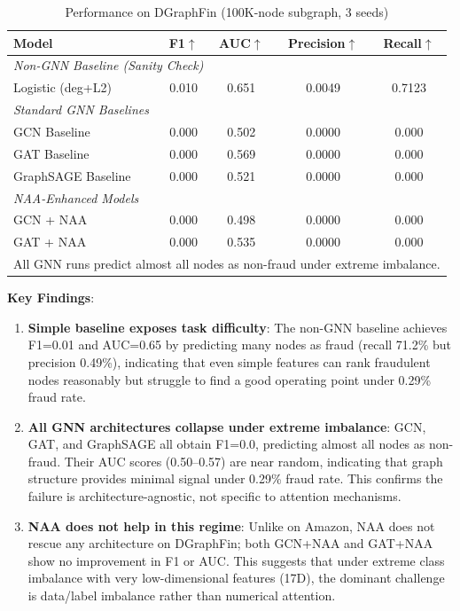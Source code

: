 \begin{table}[t]
\centering
\caption{Performance on DGraphFin (100K-node subgraph, 3 seeds)}
\label{tab:dgraphfin_main}
\small
\begin{tabular}{lcccc}
\toprule
\textbf{Model} & \textbf{F1}$\uparrow$ & \textbf{AUC}$\uparrow$ & \textbf{Precision}$\uparrow$ & \textbf{Recall}$\uparrow$ \\
\midrule
\multicolumn{5}{l}{\textit{Non-GNN Baseline (Sanity Check)}} \\
Logistic (deg+L2) & 0.010 & 0.651 & 0.0049 & 0.7123 \\
\midrule
\multicolumn{5}{l}{\textit{Standard GNN Baselines}} \\
GCN Baseline & 0.000 & 0.502 & 0.0000 & 0.000 \\
GAT Baseline & 0.000 & 0.569 & 0.0000 & 0.000 \\
GraphSAGE Baseline & 0.000 & 0.521 & 0.0000 & 0.000 \\
\midrule
\multicolumn{5}{l}{\textit{NAA-Enhanced Models}} \\
GCN + NAA & 0.000 & 0.498 & 0.0000 & 0.000 \\
GAT + NAA & 0.000 & 0.535 & 0.0000 & 0.000 \\
\bottomrule
\multicolumn{5}{l}{\footnotesize All GNN runs predict almost all nodes as non-fraud under extreme imbalance.} \\
\end{tabular}
\end{table}

\textbf{Key Findings}:

\begin{enumerate}
\item \textbf{Simple baseline exposes task difficulty}: The non-GNN baseline achieves F1=0.01 and AUC=0.65 by predicting many nodes as fraud (recall 71.2\% but precision 0.49\%), indicating that even simple features can rank fraudulent nodes reasonably but struggle to find a good operating point under 0.29\% fraud rate.

\item \textbf{All GNN architectures collapse under extreme imbalance}: GCN, GAT, and GraphSAGE all obtain F1=0.0, predicting almost all nodes as non-fraud. Their AUC scores (0.50--0.57) are near random, indicating that graph structure provides minimal signal under 0.29\% fraud rate. This confirms the failure is architecture-agnostic, not specific to attention mechanisms.

\item \textbf{NAA does not help in this regime}: Unlike on Amazon, NAA does not rescue any architecture on DGraphFin; both GCN+NAA and GAT+NAA show no improvement in F1 or AUC. This suggests that under extreme class imbalance with very low-dimensional features (17D), the dominant challenge is data/label imbalance rather than numerical attention.
\end{enumerate}

